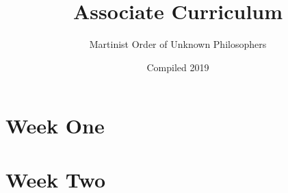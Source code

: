 \documentclass[]{book}
\title{Associate Curriculum}
\author{Martinist Order of Unknown Philosophers}
\date{Compiled 2019}
\begin{document}
	\maketitle
	\tableofcontents
	\chapter{Week One}
		
	\chapter{Week Two}
		
	
\end{document}
